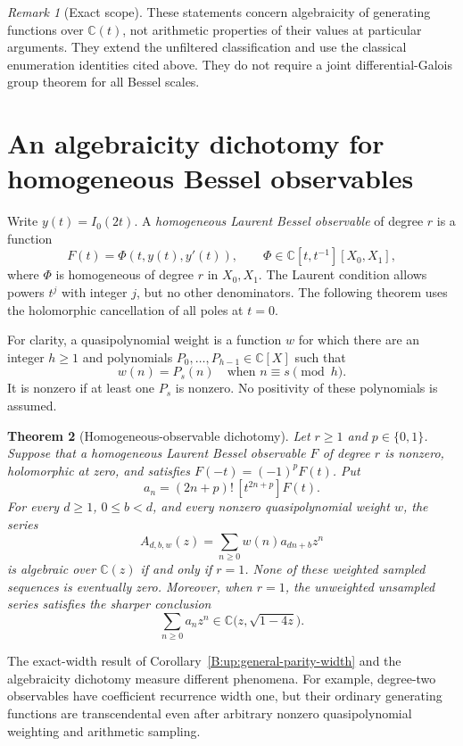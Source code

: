\documentclass[11pt,a4paper]{article}
\newtheorem{theorem}{Theorem}[section]
\theoremstyle{definition}
\theoremstyle{remark}
\newtheorem{remark}[theorem]{Remark}
\numberwithin{equation}{section}
\begin{document}
\begin{remark}[Exact scope]
These statements concern algebraicity of generating functions over
$\mathbb C(t)$, not arithmetic properties of their values at particular
arguments. They extend the unfiltered classification and use the
classical enumeration identities cited above. They do not require a joint
differential-Galois group theorem for all Bessel scales.
\end{remark}


\section{An algebraicity dichotomy for homogeneous Bessel observables}
\label{fusion:observables}

Write $y(t)=I_0(2t)$.  A \emph{homogeneous Laurent Bessel observable}
of degree $r$ is a function
\[
 F(t)=\Phi(t,y(t),y'(t)),\qquad
 \Phi\in\mathbb C[t,t^{-1}][X_0,X_1],
\]
where $\Phi$ is homogeneous of degree $r$ in $X_0,X_1$.
The Laurent condition allows powers $t^j$ with integer
$j$, but no other denominators.  The following theorem uses the
holomorphic cancellation of all poles at $t=0$.

For clarity, a quasipolynomial weight is a function $w$ for which
there are an integer $h\ge1$ and polynomials
$P_0,\ldots,P_{h-1}\in\mathbb C[X]$ such that
\[
 w(n)=P_s(n)\quad\text{when }n\equiv s\pmod h.
\]
It is nonzero if at least one $P_s$ is nonzero.  No positivity of
these polynomials is assumed.

\begin{theorem}[Homogeneous-observable dichotomy]
\label{fusion:observable-dichotomy}
Let $r\ge1$ and $p\in\{0,1\}$.  Suppose that a homogeneous
Laurent Bessel observable $F$ of degree $r$ is nonzero,
holomorphic at zero, and satisfies $F(-t)=(-1)^pF(t)$.  Put
\[
 a_n=(2n+p)!\,[t^{2n+p}]F(t).
\]
For every $d\ge1$, $0\le b<d$, and every nonzero
quasipolynomial weight $w$, the series
\[
 A_{d,b,w}(z)=\sum_{n\ge0}w(n)a_{dn+b}z^n
\]
is algebraic over $\mathbb C(z)$ if and only if $r=1$.
None of these weighted sampled sequences is eventually zero.
Moreover, when $r=1$, the unweighted unsampled series satisfies
the sharper conclusion
\[
 \sum_{n\ge0}a_nz^n\in
 \mathbb C\bigl(z,\sqrt{1-4z}\bigr).
\]
\end{theorem}

The exact-width result of Corollary~\ref{B:up:general-parity-width}
and the algebraicity dichotomy measure different phenomena.
For example, degree-two observables have coefficient recurrence
width one, but their ordinary generating functions are
transcendental even after arbitrary nonzero quasipolynomial
weighting and arithmetic sampling.
\end{document}
